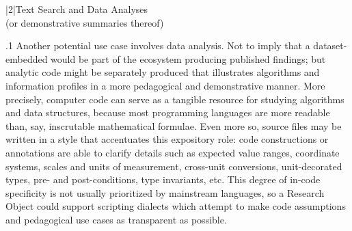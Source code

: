\documentclass[11pt, twocolumn]{article}
\begin{document}
\s|2|{Text Search and Data Analyses\\{\sth}(or demonstrative summaries thereof)}

\p.1{%
Another potential  use case involves data analysis.
Not to imply that a dataset-embedded  would be part of
the ecosystem producing published findings; but
analytic code might be separately produced that illustrates
algorithms and information profiles in a more pedagogical
and demonstrative manner. More precisely, computer code
can serve as a tangible resource for studying algorithms
and data structures, because most programming languages are
more readable than, say, inscrutable mathematical formulae.
Even more so, source files may be written in a
style that accentuates this expository role: code constructions
or annotations are able to clarify details such as expected
value ranges, coordinate systems,
scales and units of measurement, cross-unit conversions,
unit-decorated types,
pre- and post-conditions, type invariants, etc.
This degree of in-code specificity is not usually prioritized
by mainstream languages, so a Research Object  could
support scripting dialects which attempt to
make code assumptions and pedagogical use cases
as transparent as possible.
}%
\end{document}
